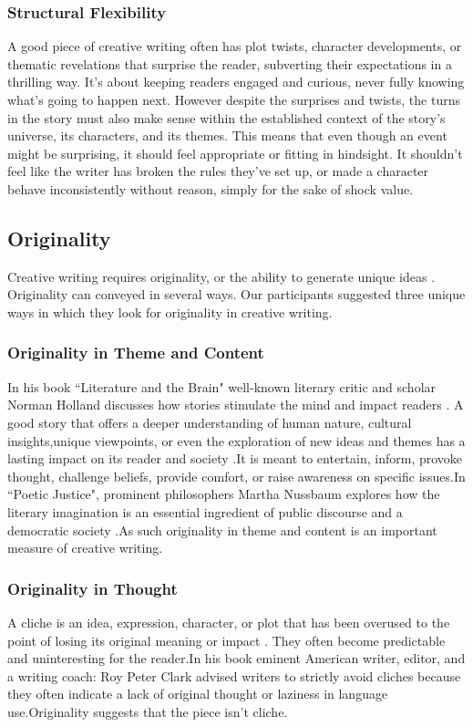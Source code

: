 \subsubsection{Structural Flexibility}
A good piece of creative writing often has plot twists, character developments, or thematic revelations that surprise the reader, subverting their expectations in a thrilling way. It's about keeping readers engaged and curious, never fully knowing what's going to happen next. However despite the surprises and twists, the turns in the story must also make sense within the established context of the story's universe, its characters, and its themes. This means that even though an event might be surprising, it should feel appropriate or fitting in hindsight. It shouldn't feel like the writer has broken the rules they've set up, or made a character behave inconsistently without reason, simply for the sake of shock value.
\subsection{Originality}
Creative writing requires originality, or the ability to generate unique ideas \cite{ward1999creative}. Originality can conveyed in several ways. Our participants suggested three unique ways in which they look for originality in creative writing.
\subsubsection{Originality in Theme and Content}
In his book ``Literature and the Brain" well-known literary critic and scholar Norman Holland discusses how stories stimulate the mind and impact readers \cite{holland2009literature}. A good story that offers a deeper understanding of human nature, cultural insights,unique viewpoints, or even the exploration of new ideas and themes has a lasting impact on its reader and society .It is meant to entertain, inform, provoke thought, challenge beliefs, provide comfort, or raise awareness on specific issues.In ``Poetic Justice", prominent philosophers Martha Nussbaum explores how the literary imagination is an essential ingredient of public discourse and a democratic society \cite{nussbaum1997poetic}.As such originality in theme and content is an important measure of creative writing.
\subsubsection{Originality in Thought}
A cliche is an idea, expression, character, or plot that has been overused to the point of losing its original meaning or impact \cite{fountain2012cliches}. They often become predictable and uninteresting for the reader.In his book \cite{clark2008writing} eminent American writer, editor, and a writing coach: Roy Peter Clark advised writers to strictly avoid cliches because they often indicate a lack of original thought or laziness in language use.Originality suggests that the piece isn't cliche.
